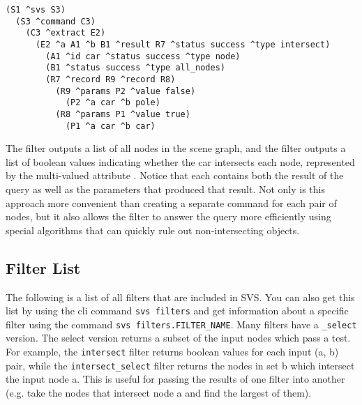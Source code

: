 \begin{verbatim}
(S1 ^svs S3)
  (S3 ^command C3)
    (C3 ^extract E2)
      (E2 ^a A1 ^b B1 ^result R7 ^status success ^type intersect)
        (A1 ^id car ^status success ^type node)
        (B1 ^status success ^type all_nodes)
        (R7 ^record R9 ^record R8)
          (R9 ^params P2 ^value false)
            (P2 ^a car ^b pole)
          (R8 ^params P1 ^value true)
            (P1 ^a car ^b car)
\end{verbatim}

The  filter outputs a list of all nodes in the scene graph, and the  filter outputs a list of boolean values indicating whether the car intersects each node, represented by the multi-valued attribute .
Notice that each  contains both the result of the query as well as the parameters that produced that result.
Not only is this approach more convenient than creating a separate command for each pair of nodes, but it also allows the  filter to answer the query more efficiently using special algorithms that can quickly rule out non-intersecting objects.

\subsection{Filter List}
The following is a list of all filters that are included in SVS. 
You can also get this list by using the cli command \texttt{svs filters} and 
get information about a specific filter using the command \texttt{svs filters.FILTER\_NAME}.
Many filters have a \texttt{\_select} version. The select version returns a subset
of the input nodes which pass a test. For example, the \texttt{intersect} filter returns
boolean values for each input (a, b) pair, while the \texttt{intersect\_select} filter
returns the nodes in set b which intersect the input node a. This is useful for passing
the results of one filter into another (e.g. take the nodes that intersect node a and find
the largest of them). 

